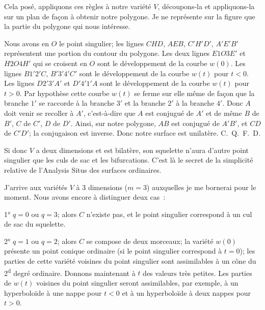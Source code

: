 \documentclass{article}
\begin{document}

Cela posé, appliquons ces règles à notre variété $V$, découpons-la et appliquons-la sur un plan de façon à obtenir notre polygone. Je ne représente sur la figure que la partie du polygone qui nous intéresse.


Nous avons en $O$ le point singulier; les lignes $CHD$, $AEB$, $C'H'D'$, $A'E'B'$ représentent une portion du contour du polygone. Les deux lignes $E1O3E'$ et $H2O4H'$ qui se croisent en $O$ sont le développement de la courbe $w(0)$. Les lignes $B1'2'C$, $B'3'4'C'$ sont le développement de la courbe $w(t)$ pour $t < 0$. Les lignes $D2'3'A'$ et $D'4'1'A$ sont le développement de la courbe $w(t)$ pour $t > 0$. Par hypothèse cette courbe $w(t)$ se ferme sur elle même de façon que la branche $1'$ se raccorde à la branche $3'$ et la branche $2'$ à la branche $4'$. Donc $A$ doit venir se recoller à $A'$, c'est-à-dire que $A$ est conjugué de $A'$ et de même $B$ de $B'$, $C$ de $C'$, $D$ de $D'$. Ainsi, sur notre polygone, $AB$ est conjugué de $A'B'$, et $CD$ de $C'D'$; la conjugaison est inverse. Donc notre surface est unilatère. C.~Q.~F.~D.

Si donc $V$ a deux dimensions et est bilatère, son squelette n'aura d'autre point singulier que les culs de sac et les bifurcations. C'est là le secret de la simplicité relative de l'Analysis Situs des surfaces ordinaires.

J'arrive aux variétés $V$ à 3 dimensions ($m = 3$) auxquelles je me bornerai pour le moment. Nous avons encore à distinguer deux cas~:

1° $q = 0$ ou $q = 3$; alors $C$ n'existe pas, et le point singulier correspond à un cul de sac du squelette.

2° $q = 1$ ou $q = 2$; alors $C$ se compose de deux morceaux; la variété $w(0)$ présente un point conique ordinaire (si le point singulier correspond à $t = 0$); les parties de cette variété voisines du point singulier sont assimilables à un cône du 2\textsuperscript{d} degré ordinaire. Donnons maintenant à $t$ des valeurs très petites. Les parties de $w(t)$ voisines du point singulier seront assimilables, par exemple, à un hyperboloïde à une nappe pour $t < 0$ et à un hyperboloïde à deux nappes pour $t > 0$.
\end{document}
